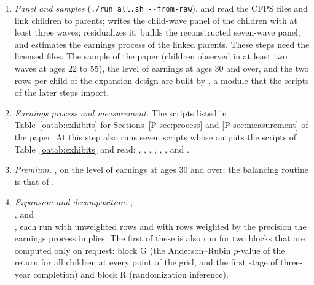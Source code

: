 \begin{enumerate}
\item \emph{Panel and samples} (\texttt{./run\_all.sh -{}-from-raw}). 
and  read the CFPS
files and link children to parents; 
writes the child-wave panel of the children with at least three waves;
 residualizes it,  builds the reconstructed seven-wave panel, and  estimates the earnings process of the linked parents.
These steps need the licensed files. The sample of the paper (children observed in at least two waves at ages 22 to 55), the level of earnings at ages 30 and over, and the two rows per child of the expansion design are built by , a module that the scripts of the later steps import.
\item \emph{Earnings process and measurement.} The scripts listed in Table~\ref{oatab:exhibits} for Sections~\ref{P-sec:process} and \ref{P-sec:measurement} of the paper. At this step  also runs seven scripts whose outputs the scripts of Table~\ref{oatab:exhibits} and  read: , , , , , , and .
\item \emph{Premium.}
, on the level of earnings at ages 30 and over; the balancing routine is that of
.
\item \emph{Expansion and decomposition.}
,\\
, and\\
, each run with unweighted rows and with rows weighted by the precision the earnings process implies. The first of these is also run for two blocks that are computed only on request: block G (the Anderson--Rubin $p$-value of the return for all children at every point of the grid, and the first stage of three-year completion) and block R (randomization inference).

\end{enumerate}
